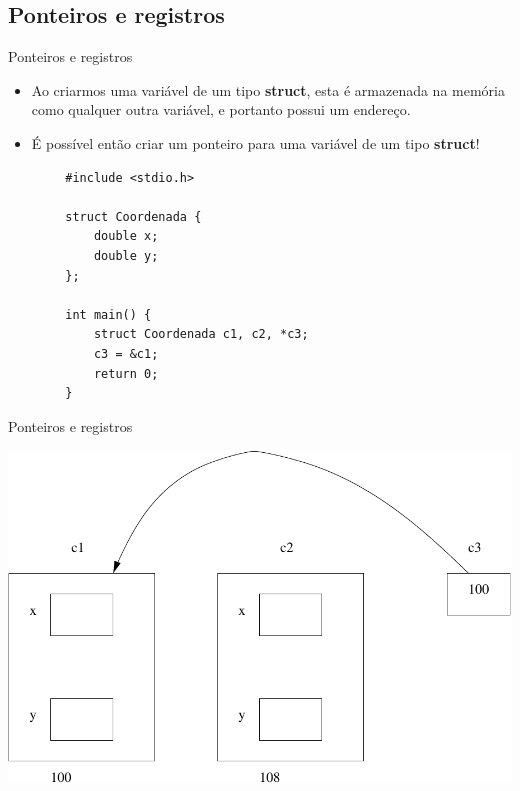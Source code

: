 \documentclass[handout]{beamer}
\begin{document}
\subsection{Ponteiros e registros}

\begin{frame}[fragile]{Ponteiros e registros}
    \begin{itemize}
        \item Ao criarmos uma variável de um tipo \textbf{struct}, esta é armazenada na memória
        como qualquer outra variável, e portanto possui um endereço.
        \item É possível então criar um ponteiro para uma variável de um tipo \textbf{struct}!
    \end{itemize}

    \begin{verbatim}
        #include <stdio.h>

        struct Coordenada {
            double x;
            double y;
        };

        int main() {
            struct Coordenada c1, c2, *c3;
            c3 = &c1;
            return 0;
        }
    \end{verbatim}

\end{frame}

\begin{frame}[fragile]{Ponteiros e registros}

    \begin{center}
        \includegraphics[scale=0.5]{ponteiro_struct}
    \end{center}

\end{frame}
\end{document}
